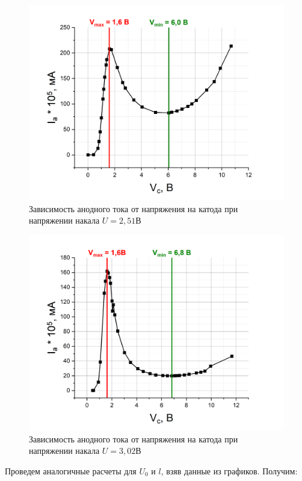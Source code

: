 \documentclass[a4paper,12pt]{article}
\begin{document}
\begin{figure}[h]
	\includegraphics[width=\linewidth]{graph1}
	\caption{Зависимость анодного тока от напряжения на катода при напряжении накала $U=2,51В$}
	\label{graph1:VAC_1}
\end{figure}

\newpage

\begin{figure}[h]
	\includegraphics[width=\linewidth]{graph2}
	\caption{Зависимость анодного тока от напряжения на катода при напряжении накала $U=3,02В$}
	\label{graph2:VAC_2}
\end{figure}

Проведем аналогичные расчеты для $U_0$ и $l$, взяв данные из графиков. Получим:
\end{document}
